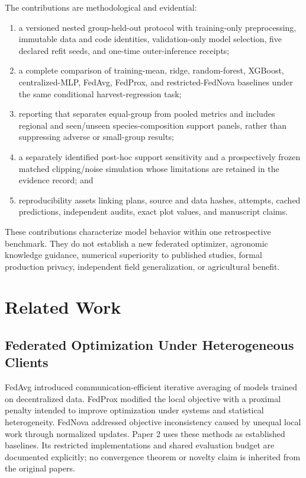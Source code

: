 \documentclass[journal]{IEEEtran}
\begin{document}
The contributions are methodological and evidential:
\begin{enumerate}
  \item a versioned nested group-held-out protocol with training-only
        preprocessing, immutable data and code identities, validation-only model
        selection, five declared refit seeds, and one-time outer-inference
        receipts;
  \item a complete comparison of training-mean, ridge, random-forest, XGBoost,
        centralized-MLP, FedAvg, FedProx, and restricted-FedNova baselines under
        the same conditional harvest-regression task;
  \item reporting that separates equal-group from pooled metrics and includes
        regional and seen/unseen species-composition support panels, rather than
        suppressing adverse or small-group results;
  \item a separately identified post-hoc support sensitivity and a prospectively
        frozen matched clipping/noise simulation whose limitations are retained
        in the evidence record; and
  \item reproducibility assets linking plans, source and data hashes, attempts,
        cached predictions, independent audits, exact plot values, and manuscript
        claims.
\end{enumerate}

These contributions characterize model behavior within one retrospective
benchmark. They do not establish a new federated optimizer, agronomic knowledge
guidance, numerical superiority to published studies, formal production
privacy, independent field generalization, or agricultural benefit.

\section{Related Work}

\subsection{Federated Optimization Under Heterogeneous Clients}

FedAvg \cite{mcmahan2017communication} introduced communication-efficient
iterative averaging of models trained on decentralized data. FedProx
\cite{li2020fedprox} modified the local objective with a proximal penalty
intended to improve optimization under systems and statistical heterogeneity.
FedNova \cite{wang2020fednova} addressed objective inconsistency caused by
unequal local work through normalized updates. Paper 2 uses these methods as
established baselines. Its restricted implementations and shared evaluation
budget are documented explicitly; no convergence theorem or novelty claim is
inherited from the original papers.
\end{document}
